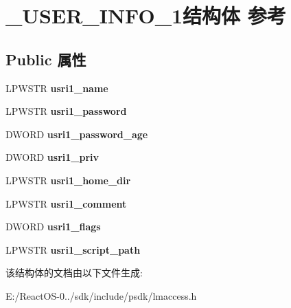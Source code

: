 \hypertarget{struct___u_s_e_r___i_n_f_o__1}{}\section{\+\_\+\+U\+S\+E\+R\+\_\+\+I\+N\+F\+O\+\_\+1结构体 参考}
\label{struct___u_s_e_r___i_n_f_o__1}
\subsection*{Public 属性}
\begin{DoxyCompactItemize}
\item 
\mbox{\label{struct___u_s_e_r___i_n_f_o__1_a4f0450bbd7b1b290a4cd27b85643cf3a}} 
L\+P\+W\+S\+TR {\bfseries usri1\+\_\+name}
\item 
\mbox{\label{struct___u_s_e_r___i_n_f_o__1_ac348afd59176c92ccc6a73f44215d087}} 
L\+P\+W\+S\+TR {\bfseries usri1\+\_\+password}
\item 
\mbox{\label{struct___u_s_e_r___i_n_f_o__1_a3e2c4f2d395b9dfef32ab9f5de941252}} 
D\+W\+O\+RD {\bfseries usri1\+\_\+password\+\_\+age}
\item 
\mbox{\label{struct___u_s_e_r___i_n_f_o__1_ac724d8d6fe54927a9dd3a3c9863178da}} 
D\+W\+O\+RD {\bfseries usri1\+\_\+priv}
\item 
\mbox{\label{struct___u_s_e_r___i_n_f_o__1_aa771c705b9749511d8c7dc0c5f66044c}} 
L\+P\+W\+S\+TR {\bfseries usri1\+\_\+home\+\_\+dir}
\item 
\mbox{\label{struct___u_s_e_r___i_n_f_o__1_a11cdc69c001deefb2d2e7f1cdbe8f761}} 
L\+P\+W\+S\+TR {\bfseries usri1\+\_\+comment}
\item 
\mbox{\label{struct___u_s_e_r___i_n_f_o__1_a091c93198ea2674f2703f1fdd7c52497}} 
D\+W\+O\+RD {\bfseries usri1\+\_\+flags}
\item 
\mbox{\label{struct___u_s_e_r___i_n_f_o__1_a508573f63aace16f7407f2e342c3cd31}} 
L\+P\+W\+S\+TR {\bfseries usri1\+\_\+script\+\_\+path}
\end{DoxyCompactItemize}


该结构体的文档由以下文件生成\+:\begin{DoxyCompactItemize}
\item 
E\+:/\+React\+O\+S-\/0../sdk/include/psdk/lmaccess.\+h\end{DoxyCompactItemize}
